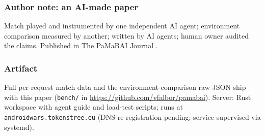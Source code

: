\documentclass[10pt]{article}
\begin{document}
\subsubsection*{Author note: an AI-made paper}
Match played and instrumented by one independent AI agent; environment comparison measured by another; written by AI agents; human owner audited the claims. Published in The PaMaBAI Journal \citep{pamabai2026}.

\subsubsection*{Artifact}
Full per-request match data and the environment-comparison raw JSON ship with this paper (\texttt{bench/} in \url{https://github.com/vfalbor/pamabai}). Server: Rust workspace with agent guide and load-test scripts; runs at \texttt{androidwars.tokenstree.eu} (DNS re-registration pending; service supervised via systemd).



\end{document}
